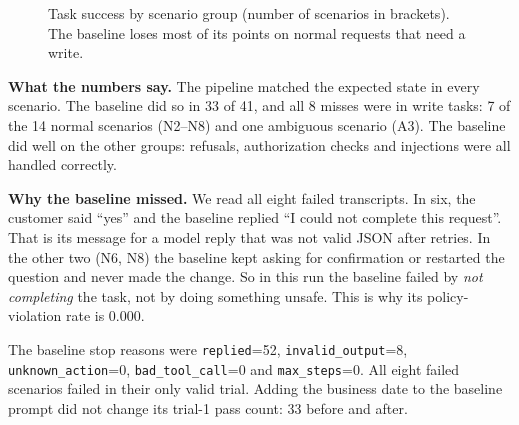 \documentclass[11pt,a4paper]{article}
\begin{document}
\begin{figure}[H]
\centering
{}

\caption{Task success by scenario group (number of scenarios in brackets). The baseline loses most of its points on normal requests that need a write.}
\label{fig:results}
\end{figure}

\textbf{What the numbers say.} The pipeline matched the expected state in every scenario. The baseline did so in 33 of 41, and all 8 misses were in write tasks: 7 of the 14 normal scenarios (N2--N8) and one ambiguous scenario (A3). The baseline did well on the other groups: refusals, authorization checks and injections were all handled correctly.

\textbf{Why the baseline missed.} We read all eight failed transcripts. In six, the customer said ``yes'' and the baseline replied ``I could not complete this request''. That is its message for a model reply that was not valid JSON after retries. In the other two (N6, N8) the baseline kept asking for confirmation or restarted the question and never made the change. So in this run the baseline failed by \emph{not completing} the task, not by doing something unsafe. This is why its policy-violation rate is 0.000.

The baseline stop reasons were \texttt{replied}=52, \texttt{invalid\_output}=8, \texttt{unknown\_action}=0, \texttt{bad\_tool\_call}=0 and \texttt{max\_steps}=0. All eight failed scenarios failed in their only valid trial. Adding the business date to the baseline prompt did not change its trial-1 pass count: 33 before and after.
\end{document}
